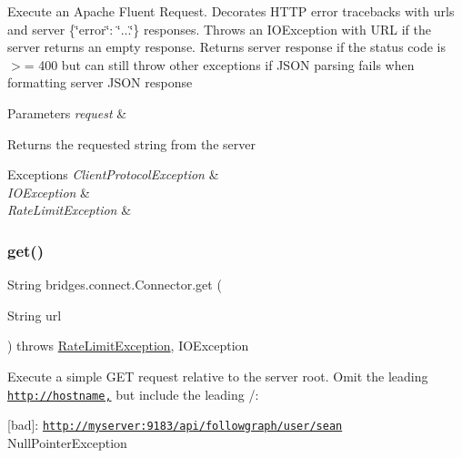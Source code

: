 Execute an Apache Fluent Request. Decorates H\+T\+TP error tracebacks with urls and server \{\char`\"{}error\char`\"{}\+: \char`\"{}...\char`\"{}\} responses. Throws an I\+O\+Exception with U\+RL if the server returns an empty response. Returns server response if the status code is $>$= 400 but can still throw other exceptions if J\+S\+ON parsing fails when formatting server J\+S\+ON response 
\begin{DoxyParams}{Parameters}
{\em request} & \\
\hline
\end{DoxyParams}
\begin{DoxyReturn}{Returns}
the requested string from the server 
\end{DoxyReturn}

\begin{DoxyExceptions}{Exceptions}
{\em Client\+Protocol\+Exception} & \\
\hline
{\em I\+O\+Exception} & \\
\hline
{\em Rate\+Limit\+Exception} & \\
\hline
\end{DoxyExceptions}
\mbox{\label{classbridges_1_1connect_1_1_connector_aec8d54bf707c50d6f8173a0c1640fcd5}} 
\subsubsection{\texorpdfstring{get()}{get()}}
{\footnotesize\ttfamily String bridges.\+connect.\+Connector.\+get (\begin{DoxyParamCaption}\item[{String}]{url }\end{DoxyParamCaption}) throws \mbox{\hyperlink{classbridges_1_1validation_1_1_rate_limit_exception}{Rate\+Limit\+Exception}}, I\+O\+Exception}

Execute a simple G\+ET request relative to the server root. Omit the leading \href{http://hostname,}{\tt http\+://hostname,} but include the leading /\+:

\mbox{[}bad\mbox{]}\+: \href{http://myserver:9183/api/followgraph/user/sean}{\tt http\+://myserver\+:9183/api/followgraph/user/sean} Null\+Pointer\+Exception \mbox{\label{classbridges_1_1connect_1_1_connector_a0b9809180aac96a83e31e224ab5ed6ec}} 
